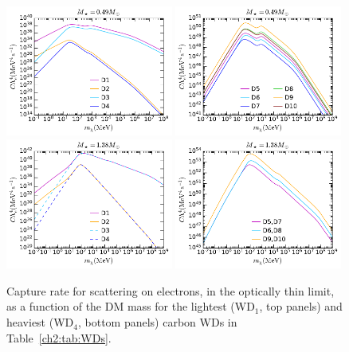 \begin{figure}
    \centering
    \includegraphics[width=0.49\textwidth]{wd_capture/C_mdm_optthin_e_0.49Msun_D1-D4.pdf}
    \includegraphics[width=0.49\textwidth]{wd_capture/C_mdm_optthin_e_0.49Msun_D5-D10.pdf} \\    
    \includegraphics[width=0.49\textwidth]{wd_capture/C_mdm_optthin_e_1.38Msun_D1-D4.pdf}
    \includegraphics[width=0.49\textwidth]{wd_capture/C_mdm_optthin_e_1.38Msun_D5-D10.pdf} \caption{
 Capture rate for scattering on electrons, in the optically thin limit, as a function of the DM mass for  the lightest (WD$_1$, top panels) and heaviest (WD$_4$, bottom panels)  
 carbon WDs in Table~\ref{ch2:tab:WDs}.}
    \label{ch4:fig:Coptthinelec}
\end{figure}

